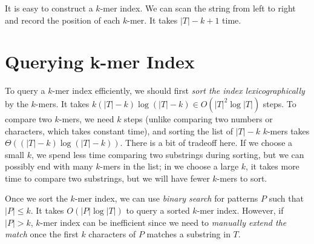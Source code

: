 It is easy to construct a $k$-mer index. We can scan the string from left to right and record the position of each $k$-mer. It takes $|T|-k+1$ time.

\section{Querying k-mer Index}

To query a $k$-mer index efficiently, we should first \textit{sort the index lexicographically} by the $k$-mers. It takes $k(|T|-k)\log(|T|-k) \in O(|T|^2 \log|T|)$ steps. To compare two $k$-mers, we need $k$ steps (unlike comparing two numbers or characters, which takes constant time), and sorting the list of $|T|-k$ $k$-mers takes $\Theta((|T|-k)\log(|T|-k))$. There is a bit of tradeoff here. If we choose a small $k$, we spend less time comparing two substrings during sorting, but we can possibly end with many $k$-mers in the list; in we choose a large $k$, it takes more time to compare two substrings, but we will have fewer $k$-mers to sort.

Once we sort the $k$-mer index, we can use \textit{binary search} for patterns $P$ such that $|P| \leq k$. It takes $O(|P|\log |T|)$ to query a sorted $k$-mer index. However, if $|P| > k$, $k$-mer index can be inefficient since we need to \textit{manually extend the match} once the first $k$ characters of $P$ matches a substring in $T$.